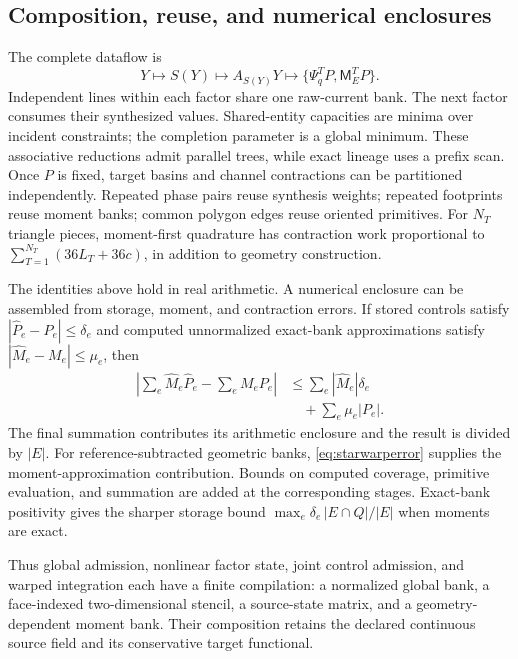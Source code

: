 \subsection{Composition, reuse, and numerical enclosures}
The complete dataflow is
\begin{equation}
 Y\longmapsto S(Y)\longmapsto A_{S(Y)}Y
 \longmapsto\{\Psi_q^TP,\mathsf M_E^TP\}.
\end{equation}
Independent lines within each factor share one raw-current bank. The next
factor consumes their synthesized values. Shared-entity capacities are
minima over incident constraints; the completion parameter is a global
minimum. These associative reductions admit parallel trees, while exact
lineage uses a prefix scan. Once $P$ is fixed, target basins and channel
contractions can be partitioned independently. Repeated phase pairs reuse
synthesis weights; repeated footprints reuse moment banks; common polygon
edges reuse oriented primitives. For $N_T$ triangle pieces, moment-first
quadrature has contraction work proportional to
$\sum_{T=1}^{N_T}(36L_T+36c)$, in addition to geometry construction.

The identities above hold in real arithmetic. A numerical enclosure can be
assembled from storage, moment, and contraction errors. If stored controls
satisfy $|\widehat P_e-P_e|\leq\delta_e$ and computed unnormalized exact-bank
approximations satisfy $|\widehat M_e-M_e|\leq\mu_e$, then
\begin{align}
 \left|\sum_e\widehat M_e\widehat P_e-\sum_eM_eP_e\right|
 &\leq\sum_e|\widehat M_e|\delta_e\nonumber\\
 &\quad+\sum_e\mu_e|P_e|.
\end{align}
The final summation contributes its arithmetic enclosure and the result is
divided by $|E|$. For reference-subtracted geometric banks,
\eqref{eq:starwarperror} supplies the moment-approximation contribution.
Bounds on computed coverage, primitive evaluation, and summation are added
at the corresponding stages. Exact-bank positivity gives the sharper storage
bound $\max_e\delta_e\,|E\cap Q|/|E|$ when moments are exact.

Thus global admission, nonlinear factor state, joint control admission, and
warped integration each have a finite compilation: a normalized global bank,
a face-indexed two-dimensional stencil, a source-state matrix, and a
geometry-dependent moment bank. Their composition retains the declared
continuous source field and its conservative target functional.
